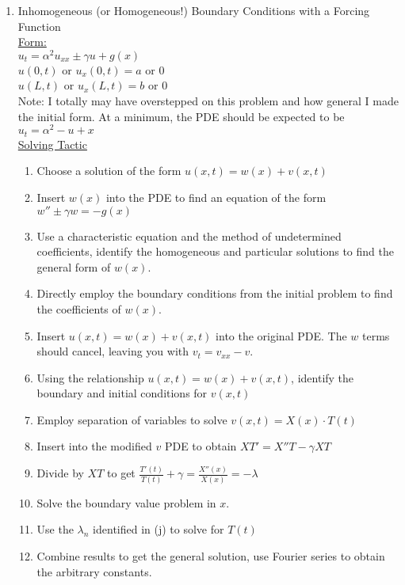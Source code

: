 \documentclass{article}
\begin{document}
\begin{enumerate}
\pagebreak

    \item Inhomogeneous (or Homogeneous!) Boundary Conditions with a Forcing Function
    \medskip\\
    \underline{Form:}
    \medskip\\
    $u_t = \alpha^2 u_{xx} \pm \gamma u + g(x)$
    \smallskip\\
    $u(0,t) \textrm{ or } u_x(0,t) = a$ or 0\\
    $u(L,t) \textrm{ or } u_x(L,t) = b$ or 0
    \medskip\\
    Note: I totally may have overstepped on this problem and how general I made the initial form. At a minimum, the PDE should be expected to be $u_t = \alpha^2 - u + x$
    \medskip\\
    \underline{Solving Tactic}
    \begin{enumerate}
        \item Choose a solution of the form $u(x,t) = w(x) + v(x,t)$
        \item Insert $w(x)$ into the PDE to find an equation of the form $w'' \pm \gamma w = -g(x)$
        \item Use a characteristic equation and the method of undetermined coefficients, identify the homogeneous and particular solutions to find the general form of $w(x)$.
        \item Directly employ the boundary conditions from the initial problem to find the coefficients of $w(x)$.
        \item Insert $u(x,t) = w(x) + v(x,t)$ into the original PDE. The $w$ terms should cancel, leaving you with $v_t = v_{xx} - v$.
        \item Using the relationship $u(x,t) = w(x) + v(x,t)$, identify the boundary and initial conditions for $v(x,t)$
        \item Employ separation of variables to solve $v(x,t) = X(x)\cdot T(t)$
        \item Insert into the modified $v$ PDE to obtain $XT' = X''T - \gamma XT$
        \item Divide by $XT$ to get $\frac{T'(t)}{T(t)} + \gamma = \frac{X''(x)}{X(x)} = -\lambda$
        \item Solve the boundary value problem in $x$.
        \item Use the $\lambda_n$ identified in (j) to solve for $T(t)$
        \item Combine results to get the general solution, use Fourier series to obtain the arbitrary constants.
    \end{enumerate}
    

\end{enumerate}
\end{document}
